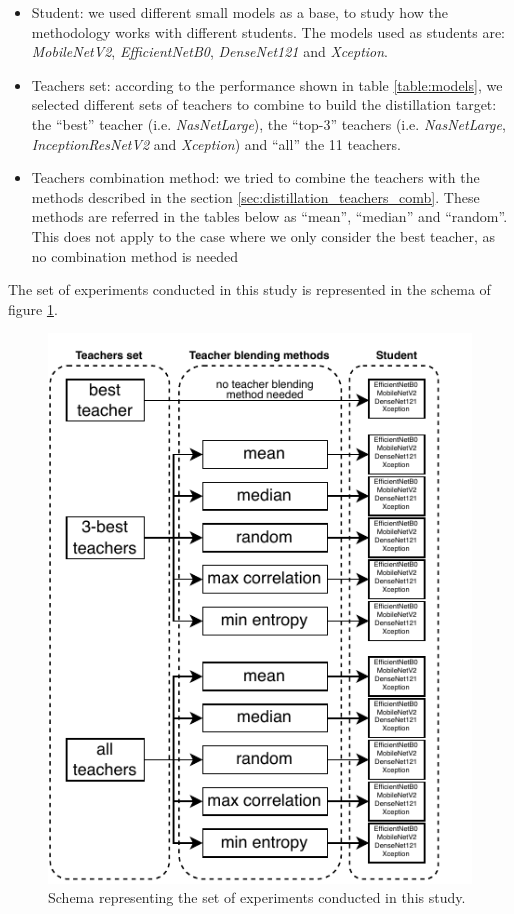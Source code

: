 \begin{itemize}
	\item Student: we used different small models as a base, to study how the methodology works with different students. The models used as students are: \textit{MobileNetV2}, \textit{EfficientNetB0}, \textit{DenseNet121} and \textit{Xception}.
	\item Teachers set: according to the performance shown in table \ref{table:models}, we selected different sets of teachers to combine to build the distillation target: the ``best'' teacher (i.e. \textit{NasNetLarge}), the ``top-3'' teachers (i.e. \textit{NasNetLarge}, \textit{InceptionResNetV2} and \textit{Xception}) and ``all'' the 11 teachers.
	\item Teachers combination method: we tried to combine the teachers with the methods described in the section \ref{sec:distillation_teachers_comb}. These methods are referred in the tables below as ``mean'', ``median'' and ``random''. This does not apply to the case where we only consider the best teacher, as no combination method is needed
\end{itemize}

The set of experiments conducted in this study is represented in the schema of figure \ref{fig:schema}.

\begin{figure}[h!]
\centering
\includegraphics[width=0.9\linewidth]{distillation/images/schema}
\caption{Schema representing the set of experiments conducted in this study.}
\label{fig:schema}
\end{figure}


